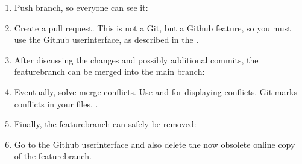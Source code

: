 \documentclass[letterpaper,10pt,english]{sphinxmanual}
\begin{document}
\begin{enumerate}
\item {} 
Push branch, so everyone can see it:

\begin{sphinxVerbatim}[commandchars=\\\{\}]
    
\end{sphinxVerbatim}

\item {} 
Create a pull request. This is not a Git, but a Github feature, so you must use the Github user\sphinxhyphen{}interface, as described in the .

\item {} 
After discussing the changes and possibly additional commits, the feature\sphinxhyphen{}branch can be merged into the main branch:

\begin{sphinxVerbatim}[commandchars=\\\{\}]
  
  
\end{sphinxVerbatim}

\item {} 
Eventually, solve merge conflicts. Use  and  for displaying conflicts. Git marks conflicts in your files, .

\item {} 
Finally, the feature\sphinxhyphen{}branch can safely be removed:

\begin{sphinxVerbatim}[commandchars=\\\{\}]
   
\end{sphinxVerbatim}

\item {} 
Go to the Github user\sphinxhyphen{}interface and also delete the now obsolete online copy of the feature\sphinxhyphen{}branch.

\end{enumerate}
\end{document}
